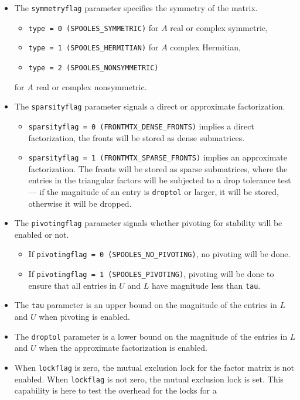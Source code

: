 \begin{enumerate}
\begin{itemize}
\begin{itemize}
{\tt type = 2 (SPOOLES\_COMPLEX)} for complex.
\end{itemize}
\item
The {\tt symmetryflag} parameter specifies the symmetry of the matrix.
\begin{itemize}
\item
{\tt type = 0 (SPOOLES\_SYMMETRIC)} for $A$ real or complex symmetric,
\item
{\tt type = 1 (SPOOLES\_HERMITIAN)} for $A$ complex Hermitian,
\item
{\tt type = 2 (SPOOLES\_NONSYMMETRIC)} 
\end{itemize}
for $A$ real or complex nonsymmetric.
\item
The {\tt sparsityflag} parameter signals a direct or approximate
factorization.
\begin{itemize}
\item
{\tt sparsityflag = 0 (FRONTMTX\_DENSE\_FRONTS)} implies a direct
factorization, the fronts will be stored as dense submatrices.
\item
{\tt sparsityflag = 1 (FRONTMTX\_SPARSE\_FRONTS)} implies an
approximate factorization.
The fronts will be stored as sparse submatrices, where
the entries in the triangular factors will be
subjected to a drop tolerance test --- if the magnitude of an entry
is {\tt droptol} or larger, it will be stored, otherwise it will be
dropped.
\end{itemize}
\item
The {\tt pivotingflag} parameter signals whether pivoting for
stability will be enabled or not.
\begin{itemize}
\item
If {\tt pivotingflag = 0 (SPOOLES\_NO\_PIVOTING)}, 
no pivoting will be done.
\item
If {\tt pivotingflag = 1 (SPOOLES\_PIVOTING)}, 
pivoting will be done to ensure that all
entries in $U$ and $L$ have magnitude less than {\tt tau}.
\end{itemize}
\item
The {\tt tau} parameter is an upper bound on the magnitude of the
entries in $L$ and $U$ when pivoting is enabled.
\item
The {\tt droptol} parameter is a lower bound on the magnitude of the
entries in $L$ and $U$ when the approximate factorization is enabled.
\item
When {\tt lockflag} is zero, the mutual exclusion lock for the
factor matrix is not enabled.
When {\tt lockflag} is not zero, the mutual exclusion lock is set.
This capability is here to test the overhead for the locks for a

\end{itemize}
\end{enumerate}
